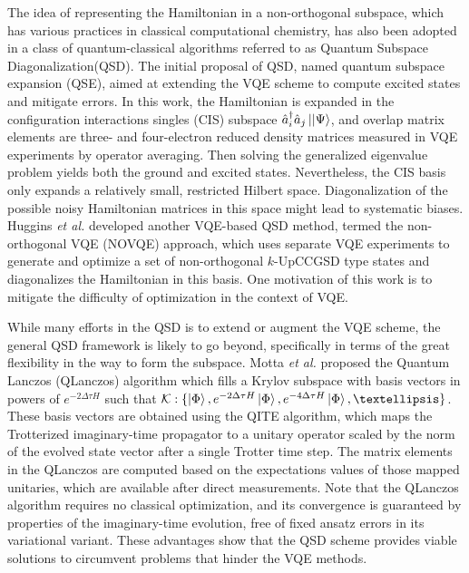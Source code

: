 \documentclass[journal=jctcce,manuscript=article]{achemso}
\newcommand{\familyname}[0]{Quantum Subspace Diagonalization\xspace}
\begin{document}
The idea of representing the Hamiltonian in a non-orthogonal subspace,\cite{ostlund1982modern} which has various practices in classical computational chemistry,\cite{Lowdin:1950tq,King:1967ev,Noodleman:1981iz,Voter:1981eu,Malmqvist:1986jh,Koch:1993tf,thom2009hartree,sundstrom2014non} has also been adopted in a class of quantum-classical algorithms referred to as \familyname (QSD).\cite{McClean:2017ct,Colless:2018hp,Motta:2019bu, Parrish:2019tc,Huggins:2019vv,Ollitrault:2019tn,Takeshita:2020dh}
The initial proposal of QSD, named quantum subspace expansion (QSE), aimed at extending the VQE scheme to compute excited states and mitigate errors.\cite{McClean:2017ct} 
In this work, the Hamiltonian is expanded in the configuration interactions singles (CIS) subspace $\hat{a}_{i}^{\dagger} \hat{a}_{j}\left\vert{|\Psi}\right\rangle$, and overlap matrix elements are three- and four-electron reduced density matrices measured in VQE experiments by operator averaging.\cite{Takeshita:2020dh} Then solving the generalized eigenvalue problem yields both the ground and excited states. Nevertheless, the CIS basis only expands a relatively small, restricted Hilbert space. Diagonalization of the possible noisy Hamiltonian matrices in this space might lead to systematic biases.\cite{Blunt:2018ee}
Huggins \textit{et al.} developed another VQE-based QSD method, termed the non-orthogonal VQE (NOVQE) approach,\cite{Huggins:2019vv} which uses separate VQE experiments to generate and optimize a set of non-orthogonal $k$-UpCCGSD type states\cite{Lee:2018cy} and diagonalizes the Hamiltonian in this basis. One motivation of this work is to mitigate the difficulty of optimization in the context of VQE.

While many efforts in the QSD is to extend or augment the VQE scheme, the general QSD framework is likely to go beyond, specifically in terms of the great flexibility in the way to form the subspace. 
Motta \textit{et al.} proposed the Quantum Lanczos (QLanczos) algorithm\cite{Motta:2019bu} which fills a Krylov subspace with basis vectors in powers of $e^{-2\Delta \tau H}$ such that $\mathcal{K}: \{\ket{\Phi}, e^{-2 \Delta \tau H}\ket{\Phi}, e^{-4  \Delta \tau H}\ket{\Phi},…  \}$. These basis vectors are obtained using the QITE algorithm,\cite{Motta:2019bu} which maps the Trotterized\cite{Trotter:1959wh} imaginary-time propagator to a unitary operator scaled by the norm of the evolved state vector after a single Trotter time step. The matrix elements in the QLanczos are computed based on the expectations values of those mapped unitaries, which are available after direct measurements. Note that the QLanczos algorithm requires no classical optimization, and its convergence is guaranteed by properties of the imaginary-time evolution, free of fixed ansatz errors in its variational variant.\cite{McArdle:2019ek} These advantages show that the QSD scheme provides viable solutions to circumvent problems that hinder the VQE methods. 
\end{document}
